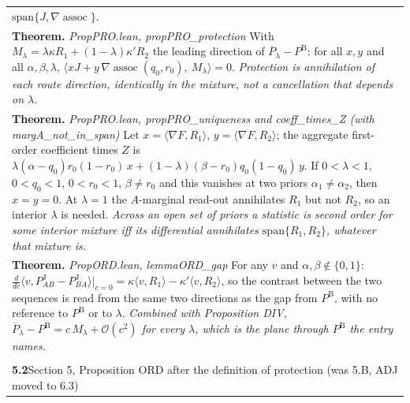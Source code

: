 \documentclass[10pt]{article}
\theoremstyle{definition}
\newcommand{\PB}{P^{\mathrm{B}}}
\newcommand{\PJ}{P^{\mathrm{J}}}
\newcommand{\Pbar}{\overline{P}}
\newcommand{\assoc}{\operatorname{assoc}}
\newcommand{\bigO}{\mathcal{O}}
\newlength{\fullw}\setlength{\fullw}{25.9cm}
\newcommand{\entryhead}[2]{\multicolumn{3}{|l|}{\rule{0pt}{2.6ex}\large\textbf{#1}\quad #2} \\ \hline}
\begin{document}
{\begin{longtable}{|p{0.9cm}|p{12.2cm}|p{12.2cm}|}
{{$\mathrm{span}\{J,\nabla\assoc\}$.}} \\
\multicolumn{3}{|p{\fullw}|}{\textbf{Theorem.} \textit{PropPRO.lean, propPRO\_protection} \newline With $M_\lambda=\lambda\kappa R_1+(1-\lambda)\kappa' R_2$ the leading direction of
$\Pbar_\lambda-\PB$: for all $x,y$ and all $\alpha,\beta,\lambda$,
$\langle xJ+y\,\nabla\!\assoc(q_0,r_0),\ M_\lambda\rangle=0$. \newline \textit{Protection is annihilation of each route direction, identically in the mixture,
not a cancellation that depends on $\lambda$.}} \\
\multicolumn{3}{|p{\fullw}|}{\textbf{Theorem.} \textit{PropPRO.lean, propPRO\_uniqueness and coeff\_times\_Z (with margA\_not\_in\_span)} \newline Let $x=\langle\nabla F,R_1\rangle$, $y=\langle\nabla F,R_2\rangle$; the aggregate
first-order coefficient times $Z$ is
$\lambda(\alpha-q_0)r_0(1-r_0)\,x+(1-\lambda)(\beta-r_0)q_0(1-q_0)\,y$. If $0<\lambda<1$,
$0<q_0<1$, $0<r_0<1$, $\beta\neq r_0$ and this vanishes at two priors
$\alpha_1\neq\alpha_2$, then $x=y=0$. At $\lambda=1$ the $A$-marginal read-out
annihilates $R_1$ but not $R_2$, so an interior $\lambda$ is needed. \newline \textit{Across an open set of priors a statistic is second order for some interior mixture
iff its differential annihilates $\mathrm{span}\{R_1,R_2\}$, whatever that mixture is.}} \\
\multicolumn{3}{|p{\fullw}|}{\textbf{Theorem.} \textit{PropORD.lean, lemmaORD\_gap} \newline For any $v$ and $\alpha,\beta\notin\{0,1\}$:
$\frac{d}{dc}\langle v,\PJ_{AB}-\PJ_{BA}\rangle\big|_{c=0}=\kappa\langle v,R_1\rangle-\kappa'\langle v,R_2\rangle$,
so the contrast between the two sequences is read from the same two directions as the
gap from $\PB$, with no reference to $\PB$ or to $\lambda$. \newline \textit{Combined with Proposition DIV, $\Pbar_\lambda-\PB=c\,M_\lambda+\bigO(c^2)$ for every
$\lambda$, which is the plane through $\PB$ the entry names.}} \\ \hline
\multicolumn{3}{|l|}{} \\ \hline
\entryhead{5.2}{Section 5, Proposition ORD after the definition of protection (was 5.B, ADJ moved to 6.3)\quad{\footnotesize\textit{(formerly E.10)}}}

\end{longtable}}
\end{document}
